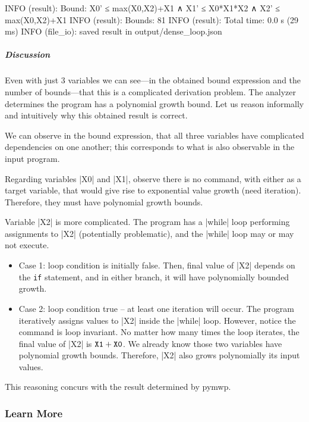 \begin{outlisting}[label={lst:ex5-output}]
INFO (result): Bound: X0' ≤ max(X0,X2)+X1 ∧ X1' ≤ X0*X1*X2 ∧ X2' ≤ max(X0,X2)+X1
INFO (result): Bounds: 81
INFO (result): Total time: 0.0 s (29 ms)
INFO (file_io): saved result in output/dense_loop.json
\end{outlisting}

\subparagraph*{Discussion}
Even with just 3 variables we can see---in the obtained bound expression and the number of bounds---that this is a complicated derivation problem.
The analyzer determines the program has a polynomial growth bound.
Let us reason informally and intuitively why this obtained result is correct.

We can observe in the bound expression, that all three variables have complicated dependencies on one another;
this corresponds to what is also observable in the input program.

Regarding variables \pr|X0| and \pr|X1|, observe there is no command, with either as a target variable, that would give rise to exponential value growth (need iteration).
Therefore, they must have polynomial growth bounds.

Variable \pr|X2| is more complicated.
The program has a \pr|while| loop performing assignments to \pr|X2| (potentially problematic), and the \pr|while| loop may or may not execute.

\begin{itemize}

\item Case 1: loop condition is initially false.
Then, final value of \pr|X2| depends on the \texttt{if} statement, and in either branch, it will have polynomially bounded growth.

\item Case 2: loop condition true -- at least one iteration will occur.
The program iteratively assigns values to \pr|X2| inside the \pr|while| loop.
However, notice the command is loop invariant.
No matter how many times the loop iterates, the final value of \pr|X2| is \(\prm{X1} + \prm{X0}\).
We already know those two variables have polynomial growth bounds.
Therefore, \pr|X2| also grows polynomially \wrt its input values.

\end{itemize}

This reasoning concurs with the result determined by pymwp.

\subsubsection{Learn More}\label{guide-learn-more}

